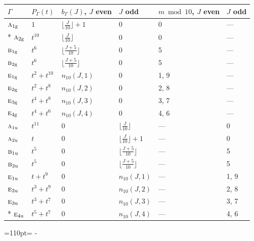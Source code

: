 \documentclass[10pt,a4paper]{article}
\newcommand{\needspace}[1]{\par\penalty-100\begingroup\dimen0=#1\relax\dimen2=\pagegoal
  \advance\dimen2-\pagetotal\ifdim\dimen0>\dimen2\relax\ifdim\dimen2>0pt\vfil\break\fi\fi
  \endgroup}
\numberwithin{equation}{section}
\newcommand{\irr}[1]{\text{\normalfont\scshape #1}}
\newcommand{\ptag}[1]{\mathrm{#1}}
\begin{document}
{\small{\renewcommand{\arraystretch}{1.3}\begin{longtable}{@{}llllll@{}}\toprule
$\Gamma$ & $P_\Gamma(t)$ & $b_\Gamma(J)$, $J$ even & $J$ odd & $m \bmod 10$, $J$ even & $J$ odd\\\midrule\endhead
\bottomrule\endfoot\endlastfoot
$\irr{a}_{1\ptag{g}}$ & $1$ & $\bigl\lfloor\tfrac{J}{10}\bigr\rfloor + 1$ & $0$ & 0 & ---\\*
$\irr{a}_{2\ptag{g}}$ & $t^{10}$ & $\bigl\lfloor\tfrac{J}{10}\bigr\rfloor$ & $0$ & 0 & ---\\
$\irr{b}_{1\ptag{g}}$ & $t^{6}$ & $\bigl\lfloor\tfrac{J+5}{10}\bigr\rfloor$ & $0$ & 5 & ---\\
$\irr{b}_{2\ptag{g}}$ & $t^{6}$ & $\bigl\lfloor\tfrac{J+5}{10}\bigr\rfloor$ & $0$ & 5 & ---\\
$\irr{e}_{1\ptag{g}}$ & $t^{2} + t^{10}$ & $n_{10}(J,1)$ & $0$ & 1, 9 & ---\\
$\irr{e}_{2\ptag{g}}$ & $t^{2} + t^{8}$ & $n_{10}(J,2)$ & $0$ & 2, 8 & ---\\
$\irr{e}_{3\ptag{g}}$ & $t^{4} + t^{8}$ & $n_{10}(J,3)$ & $0$ & 3, 7 & ---\\
$\irr{e}_{4\ptag{g}}$ & $t^{4} + t^{6}$ & $n_{10}(J,4)$ & $0$ & 4, 6 & ---\\
$\irr{a}_{1\ptag{u}}$ & $t^{11}$ & $0$ & $\bigl\lfloor\tfrac{J}{10}\bigr\rfloor$ & --- & 0\\
$\irr{a}_{2\ptag{u}}$ & $t$ & $0$ & $\bigl\lfloor\tfrac{J}{10}\bigr\rfloor + 1$ & --- & 0\\
$\irr{b}_{1\ptag{u}}$ & $t^{5}$ & $0$ & $\bigl\lfloor\tfrac{J+5}{10}\bigr\rfloor$ & --- & 5\\
$\irr{b}_{2\ptag{u}}$ & $t^{5}$ & $0$ & $\bigl\lfloor\tfrac{J+5}{10}\bigr\rfloor$ & --- & 5\\
$\irr{e}_{1\ptag{u}}$ & $t + t^{9}$ & $0$ & $n_{10}(J,1)$ & --- & 1, 9\\
$\irr{e}_{2\ptag{u}}$ & $t^{3} + t^{9}$ & $0$ & $n_{10}(J,2)$ & --- & 2, 8\\
$\irr{e}_{3\ptag{u}}$ & $t^{3} + t^{7}$ & $0$ & $n_{10}(J,3)$ & --- & 3, 7\\*
$\irr{e}_{4\ptag{u}}$ & $t^{5} + t^{7}$ & $0$ & $n_{10}(J,4)$ & --- & 4, 6\\
\bottomrule\end{longtable}}}
\needspace{110pt}
\end{document}
